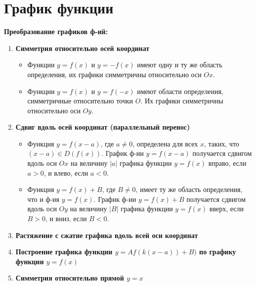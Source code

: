 \section{График функции}
\textbf{Преобразование графиков ф-ий:}

\begin{enumerate}
	
	\item \textbf{Симметрия относительно осей координат}
	\begin{itemize}
		\item 
		Функции $y = f(x)$ и $y = -f(x)$ имеют одну и ту же область определения, их графики симметричны относительно оси $Ox$.
		\item 
		Функции $y = f(x)$ и $y = f(-x)$ имеют области определения, симметричные относительно точки $O$. Их графики симметричны относительно оси $Oy$.
	\end{itemize}

	\item \textbf{Сдвиг вдоль осей координат (параллельный перенос)}
	\begin{itemize}
		\item 
		Функция $y = f(x - a)$, где $a \neq 0$, определена для всех $x$, таких, что $(x - a) \in D(f(x))$. График ф-ии $y = f(x - a)$ 
		получается сдвигом вдоль оси $Ox$ на величину $|a|$ графика функции $y = f(x)$ вправо, если $a > 0$, 
		и влево, если $a < 0$.
		\item
		Функция $y = f(x) + B$, где $B \neq 0$, имеет ту же область определения, что и ф-ия $y = f(x)$. График ф-ии $y = f(x) + B$ 
		получается сдвигом вдоль оси $Oy$ на величину $|B|$ графика функции $y = f(x)$ вверх, если $B > 0$, 
		и вниз, если $B < 0$.
	\end{itemize}
	
	\item \textbf{Растяжение с сжатие графика вдоль всей оси координат}\\
	
	\item \textbf{Построение графика функции $y = Af(k(x - a)) + B)$ по графику функции $y = f(x)$}\\
	
	\item \textbf{Симметрия относительно прямой $y = x$}\\
	
\end{enumerate}

